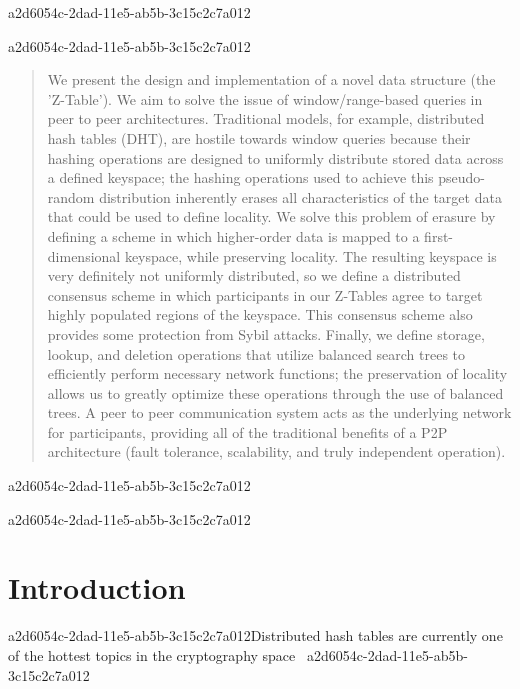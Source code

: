 \documentclass[12pt]{article}
\begin{document}
a2d6054c-2dad-11e5-ab5b-3c15c2c7a012\maketitle

a2d6054c-2dad-11e5-ab5b-3c15c2c7a012\begin{abstract}
We present the design and implementation of a novel data structure (the 'Z-Table'). We aim to solve the issue of window/range-based queries in peer to peer architectures. Traditional models, for example,  distributed hash tables (DHT), are hostile towards window queries because their hashing operations are designed to uniformly distribute stored data across a defined keyspace; the hashing operations used to achieve this pseudo-random distribution inherently erases all characteristics of the target data that could be used to define locality. We solve this problem of erasure by defining a scheme in which higher-order data is mapped to a first-dimensional keyspace, while preserving locality. The resulting keyspace is very definitely not uniformly distributed, so we define a distributed consensus scheme in which participants in our Z-Tables agree to target highly populated regions of the keyspace. This consensus scheme also provides some protection from Sybil attacks. Finally, we define storage, lookup, and deletion operations that utilize balanced search trees to efficiently perform necessary network functions; the preservation of locality allows us to greatly optimize these operations through the use of balanced trees. A peer to peer communication system acts as the underlying network for participants, providing all of the traditional benefits of a P2P architecture (fault tolerance, scalability, and truly independent operation).
\end{abstract}
a2d6054c-2dad-11e5-ab5b-3c15c2c7a012

\newpage
a2d6054c-2dad-11e5-ab5b-3c15c2c7a012\section{Introduction}
a2d6054c-2dad-11e5-ab5b-3c15c2c7a012Distributed hash tables are currently one of the hottest topics in the cryptography space~\cite{Stoica:2001dj,Rowstron:2001ea,Ratnasamy:2001wn}
a2d6054c-2dad-11e5-ab5b-3c15c2c7a012
\printbibliography
\end{document}
